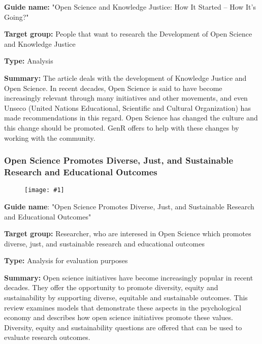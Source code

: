 \documentclass{article}
\newlength{\imgwidth}
\newcommand\scaledgraphics[2]{%
                
\settowidth{\imgwidth}{\texttt{[image: \#1]}}%
                
\setlength{\imgwidth}{\minof{\imgwidth}{#2\textwidth}}%
                
\texttt{[image: \#1]}%
                
}
\begin{document}
\textbf{Guide name:} "Open Science and Knowledge Justice: How It Started – How It’s Going?" \autocite{noauthor_open_2021}


\textbf{Target group: }People that want to research the Development of Open Science and Knowledge Justice


\textbf{Type:} Analysis


\textbf{Summary:} The article deals with the development of Knowledge Justice and Open Science. In recent decades, Open Science is said to have become increasingly relevant through many initiatives and other movements, and even Unseco (United Nations Educational, Scientific and Cultural Organization) has made recommendations in this regard. Open Science has changed the culture and this change should be promoted. GenR offers to help with these changes by working with the community.


\subsubsection{Open Science Promotes Diverse, Just, and Sustainable Research and Educational Outcomes}\label{H4807510}


\begin{figure}
\scaledgraphics{23f9ee73-dda2-4a56-8083-4a618f9983b9.png}{1}
\label{F46402811}
\end{figure}





\textbf{Guide name}: "Open Science Promotes Diverse, Just, and Sustainable Research and Educational Outcomes" \autocite{grahe_open_2019}


\textbf{Target group: }Researcher, who are interesed in Open Science which promotes diverse, just, and sustainable research and educational outcomes


\textbf{Type: }Analysis for evaluation purposes


\textbf{Summary:} Open science initiatives have become increasingly popular in recent decades. They offer the opportunity to promote diversity, equity and sustainability by supporting diverse, equitable and sustainable outcomes. This review examines models that demonstrate these aspects in the psychological economy and describes how open science initiatives promote these values. Diversity, equity and sustainability questions are offered that can be used to evaluate research outcomes.








\printbibliography[title={Bibliography}]
\end{document}

